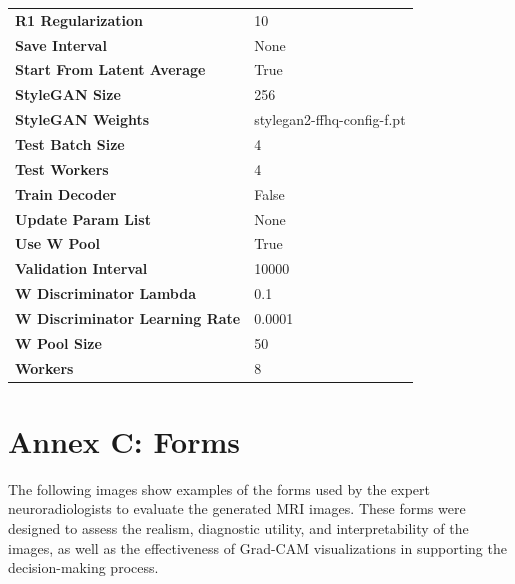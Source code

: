 \begin{table}[ht]
\begin{tabular}{l l}
\textbf{R1 Regularization}         & 10        \\                                       
\textbf{Save Interval}             & None     \\                                         
\textbf{Start From Latent Average} & True    \\                                          
\textbf{StyleGAN Size}             & 256     \\                                           
\textbf{StyleGAN Weights}          & stylegan2-ffhq-config-f.pt\\  
\textbf{Test Batch Size}           & 4        \\                                        
\textbf{Test Workers}              & 4      \\                                           
\textbf{Train Decoder}             & False    \\                                        
\textbf{Update Param List}         & None    \\                                            
\textbf{Use W Pool}                & True    \\                                       
\textbf{Validation Interval}       & 10000   \\                                          
\textbf{W Discriminator Lambda}    & 0.1      \\                                       
\textbf{W Discriminator Learning Rate} & 0.0001       \\                                  
\textbf{W Pool Size}               & 50        \\                                       
\textbf{Workers}                   & 8        \\                                         
\bottomrule
\end{tabular}
\end{table}



\clearpage
\section{Annex C: Forms}


The following images show examples of the forms used by the expert neuroradiologists to evaluate the generated MRI images. These forms were designed to assess the realism, diagnostic utility, and interpretability of the images, as well as the effectiveness of Grad-CAM visualizations in supporting the decision-making process. 



